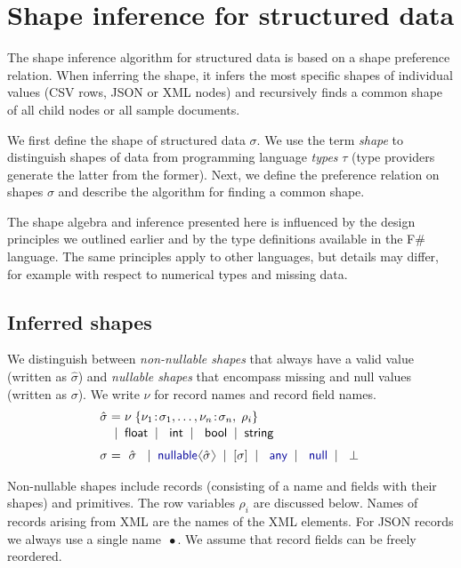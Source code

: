 \documentclass[10pt,nocopyrightspace]{sigplanconf}
\newcommand{\langl}{\begin{picture}(4.5,7)
\put(1.1,2.5){\rotatebox{60}{\line(1,0){5.5}}}
\put(1.1,2.5){\rotatebox{300}{\line(1,0){5.5}}}
\end{picture}}
\newcommand{\rangl}{\begin{picture}(4.5,7)
\put(.9,2.5){\rotatebox{120}{\line(1,0){5.5}}}
\put(.9,2.5){\rotatebox{240}{\line(1,0){5.5}}}
\end{picture}}
\newcommand{\kvd}[1]{\textnormal{\textcolor{kvdclr}{\sffamily #1}}}
\newcommand{\ident}[1]{\textnormal{\sffamily #1}}
\newcommand{\lsep}[0]{\;\; | \;\;}
\newcommand{\narrow}[1]{\hspace{-0.7em} #1 \hspace{-0.7em}}
\begin{document}
\section{Shape inference for structured data}
\label{sec:inference}

The shape inference algorithm for structured data is based on a shape preference relation. When
inferring the shape, it infers the most specific shapes of individual values (CSV rows, JSON or XML
nodes) and recursively finds a common shape of all child nodes or all sample documents.

We first define the shape of structured data $\sigma$. We use the term \emph{shape} to distinguish
shapes of data from programming language \emph{types} $\tau$ (type providers generate the latter from the former).
Next, we define the preference relation on shapes $\sigma$ and describe the algorithm
for finding a common shape.

The shape algebra and inference presented here is influenced by the design principles
we outlined earlier and by the type definitions available in the F\# language.
The same principles apply to other languages, but details may differ, for example
with respect to numerical types and missing data.



\subsection{Inferred shapes}
\label{sec:inference-types}

We distinguish between \emph{non-nullable shapes} that always have a valid value (written as
$\hat{\sigma}$) and \emph{nullable shapes} that encompass missing and \kvd{null} values
(written as $\sigma$). We write $\nu$ for record names and record field names.
\begin{equation*}
\begin{array}{rcl}
 \hat{\sigma} &\narrow{=}& \nu \; \{ \nu_1 \!:\! \sigma_1, \ldots, \nu_n \!:\! \sigma_n,\; \rho_i  \} \\[0.1em]
                &\narrow{|}& \ident{float} \lsep \ident{int} \lsep \ident{bool} \lsep \ident{string}
 \\[0.6em]
       \sigma &\narrow{=}& ~\hat{\sigma}~ \lsep \kvd{nullable}\langl \hat{\sigma} \rangl \lsep [\sigma] \lsep \kvd{any} \lsep \kvd{null}  \lsep ~\bot~
\end{array}
\end{equation*}

\noindent
Non-nullable shapes include records (consisting of a name and fields with their shapes) and
primitives. The row variables $\rho_i$ are discussed below. Names of records arising from XML are the names of the XML elements.
For JSON records we always use a single name $\,\bullet$. We assume that record fields can be freely
reordered.
\end{document}
